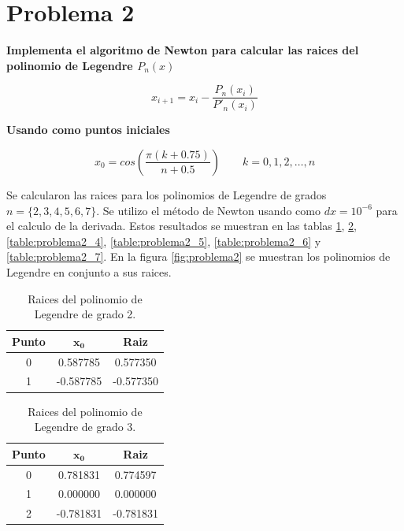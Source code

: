 \section*{Problema 2}

\textbf{Implementa el algoritmo de Newton para calcular las raices del polinomio de Legendre $P_n(x)$}

\begin{equation*}
    x_{i+1} = x_i - \frac{P_n(x_i)}{P'_n(x_i)}
\end{equation*}

\textbf{Usando como puntos iniciales}

\begin{equation*}
    x_0 = cos \left (\frac{\pi(k+0.75)}{n+0.5}\right ) \qquad k=0,1,2,\dots,n
\end{equation*}

Se calcularon las raices para los polinomios de Legendre de grados $n=\{2,3,4,5,6,7\}$. Se utilizo el método de Newton usando como $dx=10^{-6}$ para el calculo de la derivada. Estos resultados se muestran en las tablas \ref{table:problema2_2}, \ref{table:problema2_3}, \ref{table:problema2_4}, \ref{table:problema2_5}, \ref{table:problema2_6} y \ref{table:problema2_7}. En la figura \ref{fig:problema2} se muestran los polinomios de Legendre en conjunto a sus raices.

\begin{minipage}{7.5cm}
    \vspace{0.65cm}
    \begin{table}[H]
        \centering
        \begin{tabular}{ccc} \hline
            \textbf{Punto} & $\mathbf{x_0}$ & \textbf{Raiz} \\ \hline
            0              & 0.587785       & 0.577350      \\
            1              & -0.587785      & -0.577350     \\ \hline
        \end{tabular}
        \caption{Raices del polinomio de Legendre de grado 2.}
        \label{table:problema2_2}
    \end{table}
\end{minipage}
\hspace{1cm}
\begin{minipage}{7.5cm}
    \begin{table}[H]
        \centering
        \begin{tabular}{ccc} \hline
            \textbf{Punto} & $\mathbf{x_0}$ & \textbf{Raiz} \\ \hline
            0              & 0.781831       & 0.774597      \\
            1              & 0.000000       & 0.000000      \\
            2              & -0.781831      & -0.781831     \\  \hline
        \end{tabular}
        \caption{Raices del polinomio de Legendre de grado 3.}
        \label{table:problema2_3}
    \end{table}
\end{minipage}

